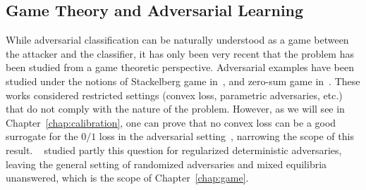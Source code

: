 \subsection{Game Theory and Adversarial Learning}

While adversarial classification can be naturally understood as a game between the attacker and the classifier, it has only been very recent that the problem has been studied from a game theoretic perspective.  Adversarial examples have been studied under  the notions of Stackelberg game in~\cite{10.1145/2020408.2020495}, and  zero-sum game in~\cite{7533509,DBLP:journals/corr/abs-1906-02816,bose2021adversarial}. These works considered restricted settings (convex loss, parametric adversaries, etc.) that do not  comply with the nature of the problem. 
However, as we will see in Chapter~\ref{chap:calibration}, one can prove that no convex loss can be a good surrogate for the $0/1$ loss in the adversarial setting~\citep{pmlr-v125-bao20a,pmlr-v97-cranko19a,xxx}, narrowing the scope of this result. ~\cite{pinot2020randomization} studied partly this question for regularized deterministic adversaries, leaving the general setting of  randomized adversaries and  mixed equilibria unanswered, which is the scope of Chapter~\ref{chap:game}.